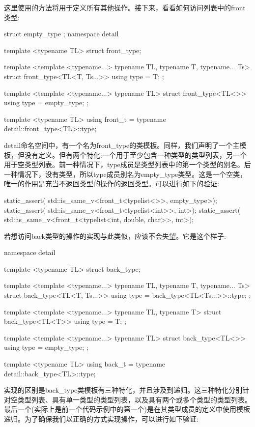 这里使用的方法将用于定义所有其他操作。接下来，看看如何访问列表中的front类型:

\begin{cpp}
struct empty_type {};
namespace detail
{
	template <typename TL>
	struct front_type;
	
	template <template <typename...> typename TL,
			  typename T, typename... Ts>
	struct front_type<TL<T, Ts...>>
	{
		using type = T;
	};

	template <template <typename...> typename TL>
	struct front_type<TL<>>
	{
		using type = empty_type;
	};
}

template <typename TL>
using front_t = typename detail::front_type<TL>::type;
\end{cpp}

detail命名空间中，有一个名为front\_type的类模板。同样，我们声明了一个主模板，但没有定义。但有两个特化:一个用于至少包含一种类型的类型列表，另一个用于空类型列表。前一种情况下，type成员是类型列表中的第一个类型的别名。后一种情况下，没有类型，所以type成员别名为empty\_type类型。这是一个空类，唯一的作用是充当不返回类型的操作的返回类型。可以进行如下的验证:

\begin{cpp}
static_assert(
	std::is_same_v<front_t<typelist<>>, empty_type>);
static_assert(
	std::is_same_v<front_t<typelist<int>>, int>);
static_assert(
	std::is_same_v<front_t<typelist<int, double, char>>,
				   int>);
\end{cpp}

若想访问back类型的操作的实现与此类似，应该不会失望。它是这个样子:

\begin{cpp}
namespace detail
{
	template <typename TL>
	struct back_type;
	
	template <template <typename...> typename TL,
			  typename T, typename... Ts>
	struct back_type<TL<T, Ts...>>
	{
		using type = back_type<TL<Ts...>>::type;
	};

	template <template <typename...> typename TL,
	          typename T>
	struct back_type<TL<T>>
	{
		using type = T;
	};

	template <template <typename...> typename TL>
	struct back_type<TL<>>
	{
		using type = empty_type;
	};
}

template <typename TL>
using back_t = typename detail::back_type<TL>::type;
\end{cpp}

实现的区别是back\_type类模板有三种特化，并且涉及到递归。这三种特化分别针对空类型列表、具有单一类型的类型列表，以及具有两个或多个类型的类型列表。最后一个(实际上是前一个代码示例中的第一个)是在其类型成员的定义中使用模板递归。为了确保我们以正确的方式实现操作，可以进行如下验证:

